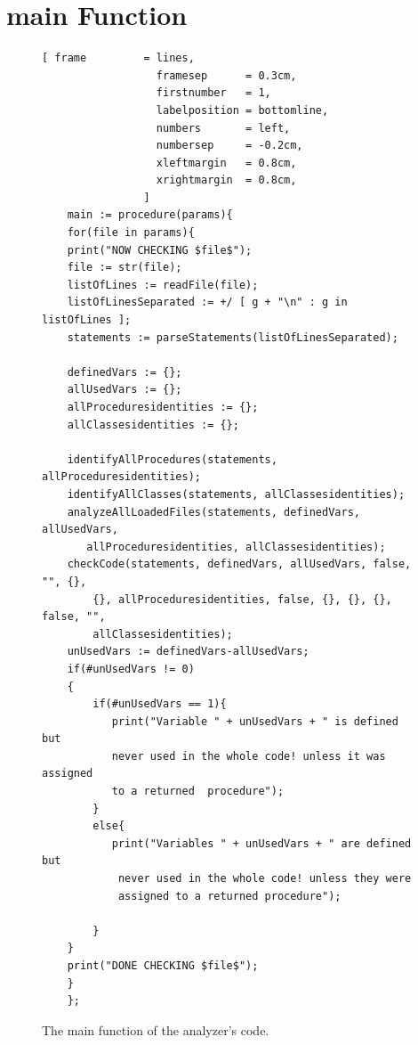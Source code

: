 \documentclass[11pt]{report}
\begin{document}
\section{main Function}

\begin{figure}[!htb]
\centering
\begin{Verbatim}[ frame         = lines, 
                  framesep      = 0.3cm, 
                  firstnumber   = 1,
                  labelposition = bottomline,
                  numbers       = left,
                  numbersep     = -0.2cm,
                  xleftmargin   = 0.8cm,
                  xrightmargin  = 0.8cm,
                ]
    main := procedure(params){
    for(file in params){
	print("NOW CHECKING $file$");
	file := str(file);
	listOfLines := readFile(file); 
	listOfLinesSeparated := +/ [ g + "\n" : g in listOfLines ];
	statements := parseStatements(listOfLinesSeparated);

	definedVars := {};
	allUsedVars := {};
	allProceduresidentities := {};
	allClassesidentities := {};
	
	identifyAllProcedures(statements, allProceduresidentities);
	identifyAllClasses(statements, allClassesidentities);
	analyzeAllLoadedFiles(statements, definedVars, allUsedVars,
	   allProceduresidentities, allClassesidentities);
	checkCode(statements, definedVars, allUsedVars, false, "", {},
	    {}, allProceduresidentities, false, {}, {}, {}, false, "", 
	    allClassesidentities);
	unUsedVars := definedVars-allUsedVars;
	if(#unUsedVars != 0)
	{
		if(#unUsedVars == 1){
		   print("Variable " + unUsedVars + " is defined but 
		   never used in the whole code! unless it was assigned 
		   to a returned  procedure");
		}
		else{
		   print("Variables " + unUsedVars + " are defined but
		    never used in the whole code! unless they were 
		    assigned to a returned procedure");
		
		}
	}
	print("DONE CHECKING $file$");
    }
    };
\end{Verbatim}
\vspace*{-0.3cm}
\caption{The main function of the analyzer's code.}
\label{fig:startAnalyzing}
\end{figure}
\end{document}
